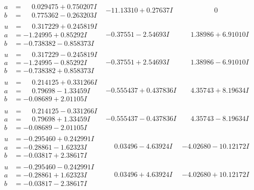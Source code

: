 \documentclass[1p]{elsarticle_modified}
\theoremstyle{definition}
\begin{document}
$$\begin{array}{c|c|c}
\begin{aligned}
a &= \phantom{-}0.029475 + 0.750207 I \\
b &= \phantom{-}0.775362 - 0.263203 I\end{aligned}
 & -11.13310 + 0.27637 I & \phantom{-0.000000 } 0 \\ \hline\begin{aligned}
u &= \phantom{-}0.317229 + 0.245819 I \\
a &= -1.24995 + 0.85292 I \\
b &= -0.738382 - 0.858373 I\end{aligned}
 & -0.37551 - 2.54693 I & \phantom{-}1.38986 + 6.91010 I \\ \hline\begin{aligned}
u &= \phantom{-}0.317229 - 0.245819 I \\
a &= -1.24995 - 0.85292 I \\
b &= -0.738382 + 0.858373 I\end{aligned}
 & -0.37551 + 2.54693 I & \phantom{-}1.38986 - 6.91010 I \\ \hline\begin{aligned}
u &= \phantom{-}0.214125 + 0.331266 I \\
a &= \phantom{-}0.79698 - 1.33459 I \\
b &= -0.08689 + 2.01105 I\end{aligned}
 & -0.555437 + 0.437836 I & \phantom{-}4.35743 + 8.19634 I \\ \hline\begin{aligned}
u &= \phantom{-}0.214125 - 0.331266 I \\
a &= \phantom{-}0.79698 + 1.33459 I \\
b &= -0.08689 - 2.01105 I\end{aligned}
 & -0.555437 - 0.437836 I & \phantom{-}4.35743 - 8.19634 I \\ \hline\begin{aligned}
u &= -0.295460 + 0.242991 I \\
a &= -0.28861 - 1.62323 I \\
b &= -0.03817 + 2.38617 I\end{aligned}
 & \phantom{-}0.03496 - 4.63924 I & -4.02680 - 10.12172 I \\ \hline\begin{aligned}
u &= -0.295460 - 0.242991 I \\
a &= -0.28861 + 1.62323 I \\
b &= -0.03817 - 2.38617 I\end{aligned}
 & \phantom{-}0.03496 + 4.63924 I & -4.02680 + 10.12172 I \\ \hline\begin{aligned}

\end{aligned}
\end{array}$$
\end{document}
